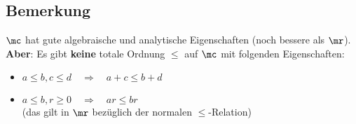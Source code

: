 \subsection{Bemerkung}
	$\mc$ hat gute algebraische und analytische Eigenschaften (noch bessere als $\mr$).\\
	\textbf{Aber}: Es gibt \textbf{keine} totale Ordnung $\leq$ auf $\mc$ mit folgenden Eigenschaften:
	\begin{itemize}
		\item $a\leq b, c\leq d \quad \Rightarrow \quad a+c\leq b+d$
		\item $a\leq b, r\geq 0 \quad \Rightarrow \quad ar\leq br$\\
			(das gilt in $\mr$ bezüglich der normalen $\leq$-Relation)
	\end{itemize}
